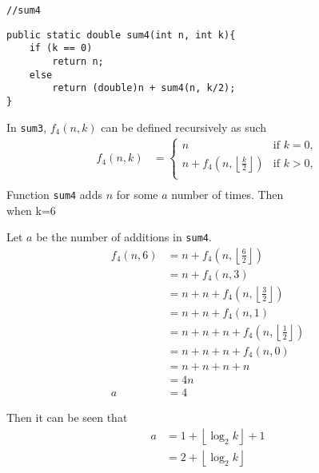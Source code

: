 \lstinline{//sum4}
\begin{lstlisting}
public static double sum4(int n, int k){
    if (k == 0)
        return n;
    else
        return (double)n + sum4(n, k/2);
}
\end{lstlisting}
In \lstinline{sum3}, $f_4(n,k)$ can be defined recursively as such
\begin{align*}
    f_4(n,k) & =
    \begin{cases}
        n                                                        & \text{if \ } k=0, \\
        n+f_4\left(n,\left\lfloor\frac{k}{2}\right\rfloor\right) & \text{if \ } k>0, \\
    \end{cases} \\
\end{align*}
Function \lstinline{sum4} adds $n$ for some $a$ number of times. Then\\
when k=6
\begin{center}
    Let $a$ be the number of additions in \lstinline{sum4}.
    \begin{align*}
        f_4(n,6) & =n+f_4\left(n,\left\lfloor\frac{6}{2}\right\rfloor\right)     \\
                 & =n+f_4(n, 3)                                                  \\
                 & =n+n+f_4\left(n,\left\lfloor\frac{3}{2}\right\rfloor\right)   \\
                 & =n+n+f_4(n,1)                                                 \\
                 & =n+n+n+f_4\left(n,\left\lfloor\frac{1}{2}\right\rfloor\right) \\
                 & =n+n+n+f_4(n,0)                                               \\
                 & =n+n+n+n                                                      \\
                 & =4n                                                           \\
        a        & =4
    \end{align*}
\end{center}
Then it can be seen that
\begin{align*}
    a & =1+\left\lfloor\log_2{k}\right\rfloor+1 \\
      & =2+\left\lfloor\log_2{k}\right\rfloor   \\
\end{align*}
